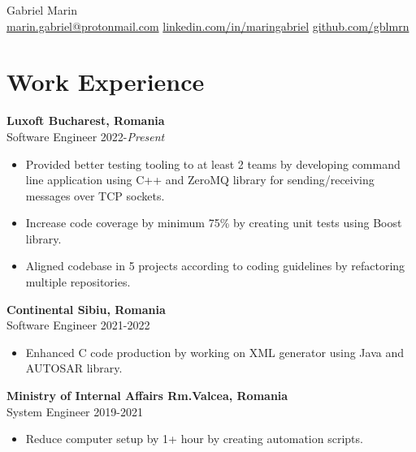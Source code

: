 \documentclass[a4paper,12pt]{article}
\begin{document}
\pagestyle{empty}

\begin{center}
\par {
  {\Huge Gabriel Marin}\\
}
\href{mailto:marin.gabriel@protonmail.com}{marin.gabriel@protonmail.com} \vrule\vspace{3mm}
\href{https://linkedin.com/in/maringabriel}{linkedin.com/in/maringabriel} \vrule\vspace{3mm}
\href{https://github.com/gblmrn}{github.com/gblmrn}
\end{center}

\section{Work Experience}
\textbf{Luxoft \hfill Bucharest, Romania}\\
Software Engineer \hfill 2022-\emph{Present}
\vspace{-3mm}
\begin{itemize}[noitemsep, leftmargin=4mm]
\item Provided better testing tooling to at least 2 teams by developing command line application using C++ and ZeroMQ library for sending/receiving messages over TCP sockets.
\item Increase code coverage by minimum 75\% by creating unit tests using Boost library.
\item Aligned codebase in 5 projects according to coding guidelines by refactoring multiple repositories.
\end{itemize}
  
\textbf{Continental \hfill Sibiu, Romania}\\
Software Engineer \hfill 2021-2022
\vspace{-3mm}
\begin{itemize}[noitemsep, leftmargin=4mm]
\item Enhanced C code production by working on XML generator using Java and AUTOSAR library.
\end{itemize}

\textbf{Ministry of Internal Affairs \hfill Rm.Valcea, Romania}\\
System Engineer \hfill  2019-2021
\vspace{-3mm}
\begin{itemize}[noitemsep, leftmargin=4mm]
\item Reduce computer setup by 1+ hour by creating automation scripts.
\end{itemize}
  
\end{document}
